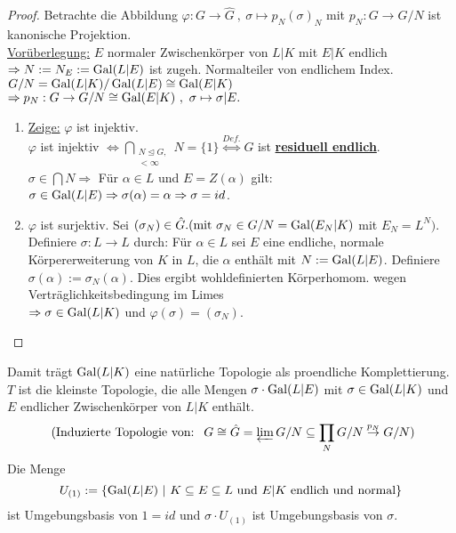 

\begin{proof}
Betrachte die Abbildung $\varphi: G \to \hat{G} \ , \ \sigma \mapsto p_N(\sigma)_N$ mit $p_N: G \to G/N$ ist kanonische Projektion.\\
\underline{Vorüberlegung:} $E$ normaler Zwischenkörper von $L|K$ mit $E|K$ endlich\\
$\Rightarrow N:=N_E:=\operatorname{Gal}(L|E)$ ist zugeh. Normalteiler von endlichem Index.\\
$G/N= \operatorname{Gal}(L|K)/\operatorname{Gal}(L|E) \cong \operatorname{Gal}(E|K)$\\
$\Rightarrow p_N: G \to G/N \cong \Gal(E|K) \ , \ \sigma \mapsto \sigma|E.$\\
\begin{enumerate}[(1)]
\item \underline{Zeige:} $\varphi$ ist injektiv.\\
$\varphi$ ist injektiv $\iff \bigcap \limits_{\substack{ N \trianglelefteq G,\\ [G:N] < \infty}} N = \{1\} \stackrel{Def.}{\iff} G$ ist \underline{\textbf{residuell endlich}}.\\
$\sigma \in \bigcap N \Rightarrow$ Für $\alpha \in L$ und $E=Z(\alpha)$ gilt: $\sigma \in \operatorname{Gal}(L|E) \Rightarrow \sigma(\alpha)=\alpha \Rightarrow \sigma=id$.
\item $\varphi$ ist surjektiv. Sei $(\sigma_N) \in \hat{G}. (\text{mit } \sigma_N \in G/N = \operatorname{Gal}(E_N|K)$ mit $E_N=L^N)$.\\
Definiere $\sigma : L \to L$ durch: Für $\alpha \in L$ sei $E$ eine endliche, normale Körpererweiterung von $K$ in $L$, die $\alpha$ enthält mit $N:= \operatorname{Gal}(L|E)$. Definiere $\sigma(\alpha):=\sigma_N(\alpha)$. Dies ergibt wohldefinierten Körperhomom. wegen Verträglichkeitsbedingung im Limes\\
$\Rightarrow \sigma \in \operatorname{Gal}(L|K)$ und $\varphi(\sigma)=(\sigma_N)$.
\end{enumerate}
\end{proof}

\begin{Bem}
Damit trägt $\operatorname{Gal}(L|K)$ eine natürliche Topologie als proendliche Komplettierung. $T$ ist die kleinste Topologie, die alle Mengen $\sigma \cdot \operatorname{Gal}(L|E)$ mit $\sigma  \in \operatorname{Gal}(L|K)$ und $E$ endlicher Zwischenkörper von $L|K$ enthält. 
\[\text{ (Induzierte Topologie von: \ } G \cong \hat{G} = \varprojlim\limits G/N \subseteq \prod_N G/N \stackrel{p_N}{\to} G/N)\]
Die Menge
\[U_{(1)} := \{\operatorname{Gal}(L|E) \ | \ K \subseteq E \subseteq L \text{ und } E|K \text{ endlich und normal} \}\]
ist Umgebungsbasis von $1=id$ und $\sigma \cdot U_{(1)}$ ist Umgebungsbasis von $\sigma$.
\end{Bem}

